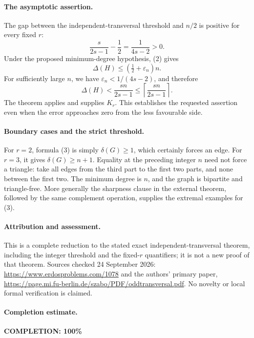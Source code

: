 \paragraph{The asymptotic assertion.}
The gap between the independent-transversal threshold and \(n/2\) is positive for every fixed \(r\):
\[
 \frac{s}{2s-1}-\frac12=\frac1{4s-2}>0.
\]
Under the proposed minimum-degree hypothesis, (2) gives
\[
 \Delta(H)\leq(\tfrac12+\varepsilon_n)n.
\]
For sufficiently large \(n\), we have
\(\varepsilon_n<1/(4s-2)\), and therefore
\[
 \Delta(H)<\frac{s n}{2s-1}
 \leq\left\lceil\frac{s n}{2s-1}\right\rceil.
\]
The theorem applies and supplies \(K_r\). This establishes the requested assertion even when the error approaches zero from the less favourable side.

\paragraph{Boundary cases and the strict threshold.}
For \(r=2\), formula (3) is simply \(\delta(G)\geq1\), which certainly forces an edge. For \(r=3\), it gives \(\delta(G)\geq n+1\). Equality at the preceding integer \(n\) need not force a triangle: take all edges from the third part to the first two parts, and none between the first two. The minimum degree is \(n\), and the graph is bipartite and triangle-free. More generally the sharpness clause in the external theorem, followed by the same complement operation, supplies the extremal examples for (3).

\paragraph{Attribution and assessment.}
This is a complete reduction to the stated exact independent-transversal theorem, including the integer threshold and the fixed-\(r\) quantifiers; it is not a new proof of that theorem. Sources checked 24 September 2026: \url{https://www.erdosproblems.com/1078} and the authors' primary paper, \url{https://page.mi.fu-berlin.de/szabo/PDF/oddtransversal.pdf}. No novelty or local formal verification is claimed.

\paragraph{Completion estimate.}
\textbf{COMPLETION: 100\%}
